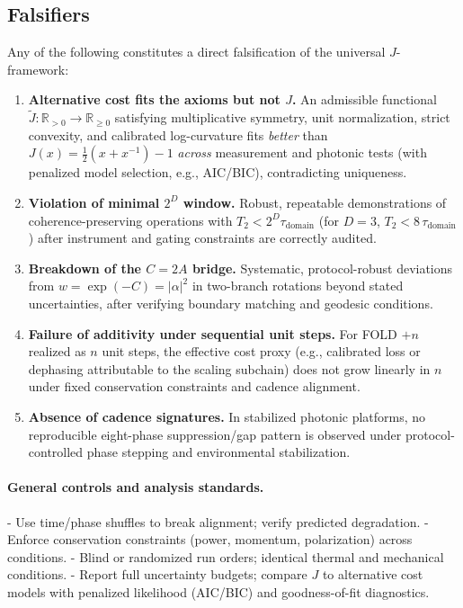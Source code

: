 \documentclass[12pt,a4paper]{article}
\begin{document}
\subsection{Falsifiers}
Any of the following constitutes a direct falsification of the universal $J$-framework:
\begin{enumerate}
  \item \textbf{Alternative cost fits the axioms but not $J$.} An admissible functional $\tilde J:\mathbb{R}_{>0}\!\to\!\mathbb{R}_{\ge 0}$ satisfying multiplicative symmetry, unit normalization, strict convexity, and calibrated log-curvature fits \emph{better} than $J(x)=\tfrac{1}{2}(x+x^{-1})-1$ \emph{across} measurement and photonic tests (with penalized model selection, e.g., AIC/BIC), contradicting uniqueness.
  \item \textbf{Violation of minimal $2^{D}$ window.} Robust, repeatable demonstrations of coherence-preserving operations with $T_{2}<2^{D}\tau_{\mathrm{domain}}$ (for $D=3$, $T_{2}<8\,\tau_{\mathrm{domain}}$) after instrument and gating constraints are correctly audited.
  \item \textbf{Breakdown of the $C=2A$ bridge.} Systematic, protocol-robust deviations from $w=\exp(-C)=|\alpha|^{2}$ in two-branch rotations beyond stated uncertainties, after verifying boundary matching and geodesic conditions.
  \item \textbf{Failure of additivity under sequential unit steps.} For FOLD $+n$ realized as $n$ unit steps, the effective cost proxy (e.g., calibrated loss or dephasing attributable to the scaling subchain) does not grow linearly in $n$ under fixed conservation constraints and cadence alignment.
  \item \textbf{Absence of cadence signatures.} In stabilized photonic platforms, no reproducible eight-phase suppression/gap pattern is observed under protocol-controlled phase stepping and environmental stabilization.
\end{enumerate}

\paragraph{General controls and analysis standards.}
- Use time/phase shuffles to break alignment; verify predicted degradation.
- Enforce conservation constraints (power, momentum, polarization) across conditions.
- Blind or randomized run orders; identical thermal and mechanical conditions.
- Report full uncertainty budgets; compare $J$ to alternative cost models with penalized likelihood (AIC/BIC) and goodness-of-fit diagnostics.
\end{document}
